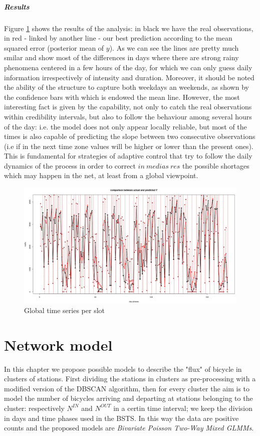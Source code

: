 \documentclass[11pt,twoside]{report}
\begin{document}
\paragraph{Results}
Figure \ref{fig:time series} shows the results of the analysis: in black we have the real observations, in red - linked by another line - our best prediction according to the mean squared error (posterior mean of $ y $). As we can see the lines are pretty much smilar and show most of the differences in days where there are strong rainy phenomena centered in a few hours of the day, for which we can only guess daily information irrespectively of intensity and duration. Moreover, it should be noted the ability of the structure to capture both weekdays an weekends, as shown by the confidence bars with which is endowed the mean line. However, the most interesting fact is given by the capability, not only to catch the real observations within credibility intervals, but also to follow the behaviour among several hours of the day: i.e. the model does not only appear locally reliable, but most of the times is also capable of predicting the slope between two consecutive observations (i.e if in the next time zone values will be higher or lower than the present ones). This is fundamental for strategies of adaptive control that try to follow the daily dynamics of the process in order to correct $ in\ medias\ res $ the possible shortages which may happen in the net, at least from a global viewpoint.

\begin{figure}[H]
	\centering
	\includegraphics[width=140 mm]{pictures/Time_series.png}
	\caption{Global time series per slot}
	\label{fig:time series}
\end{figure}%



\chapter{Network model}
In this chapter we propose possible models to describe the "flux" of bicycle in clusters of stations. First dividing the stations in clusters as pre-processing with a modified version of the DBSCAN algorithm, then for every cluster the aim is to model the number of bicycles arriving and departing at stations belonging to the cluster: respectively $N^{IN}$ and $N^{OUT}$ in a certin time interval; we keep the division in days and time phases used in the BSTS. In this way the data are positive counts and the proposed models are \emph{Bivariate Poisson Two-Way Mixed GLMMs}.\\
\end{document}
